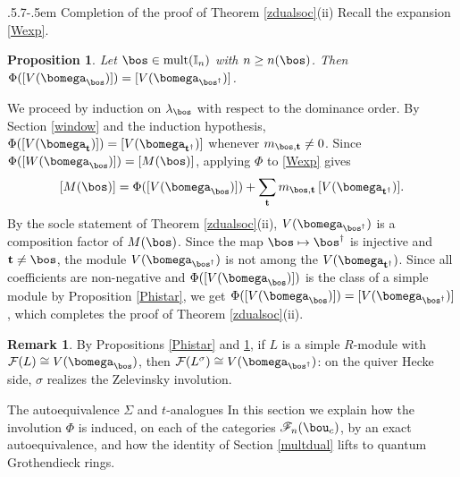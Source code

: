 \documentclass[11pt,reqno]{amsart}
\makeatletter
\newtheorem*{prop}{Proposition}
\theoremstyle{definition} \newtheorem*{defn}{Definition}
\theoremstyle{definition}
\newtheorem*{rem}{Remark}
\newenvironment{pf}{\proof}{\endproof}
\numberwithin{equation}{section}
\def\section{\def\@secnumfont{\mdseries}\@startsection{section}{1}%
  \z@{.7\linespacing\@plus\linespacing}{.5\linespacing}%
  {\normalfont\scshape\centering}}
\def\subsection{\def\@secnumfont{\bfseries}\@startsection{subsection}{2}%
  {\parindent}{.5\linespacing\@plus.7\linespacing}{-.5em}%
  {\normalfont\bfseries}}
\makeatother
\begin{document}
\subsection{Completion of the proof of Theorem \ref{zdualsoc}(ii)}
Recall the expansion \eqref{Wexp}.
\begin{prop}\label{OmegaPhi}
Let $\bos\in{\rm mult}(\mathbb I_n)$ with $n\ge n(\bos)$. Then $\Phi([V(\bomega_\bos)])=[V(\bomega_{\bos^\dagger})]$.
\end{prop}
\begin{pf}
We proceed by induction on $\lambda_\bos$ with respect to the dominance order. By Section \ref{window} and the induction hypothesis, $\Phi([V(\bomega_{\mathbf t})])=[V(\bomega_{\mathbf t^\dagger})]$ whenever $m_{\bos,\mathbf t}\neq0$. Since $\Phi([W(\bomega_\bos)])=[M(\bos)]$, applying $\Phi$ to \eqref{Wexp} gives
$$[M(\bos)]=\Phi([V(\bomega_\bos)])+\sum_{\mathbf t}m_{\bos,\mathbf t}\,[V(\bomega_{\mathbf t^\dagger})].$$
By the socle statement of Theorem \ref{zdualsoc}(ii), $V(\bomega_{\bos^\dagger})$ is a composition factor of $M(\bos)$. Since the map $\bos\mapsto\bos^\dagger$ is injective and $\mathbf t\neq\bos$, the module $V(\bomega_{\bos^\dagger})$ is not among the $V(\bomega_{\mathbf t^\dagger})$. Since all coefficients are non-negative and $\Phi([V(\bomega_\bos)])$ is the class of a simple module by Proposition \ref{Phistar}, we get $\Phi([V(\bomega_\bos)])=[V(\bomega_{\bos^\dagger})]$, which completes the proof of Theorem \ref{zdualsoc}(ii).
\end{pf}
\begin{rem}
By Propositions \ref{Phistar} and \ref{OmegaPhi}, if $L$ is a simple $R$-module with $\mathcal F(L)\cong V(\bomega_\bos)$, then $\mathcal F(L^\sigma)\cong V(\bomega_{\bos^\dagger})$: on the quiver Hecke side, $\sigma$ realizes the Zelevinsky involution.
\end{rem}

\section{The autoequivalence $\Sigma$ and $t$-analogues}\label{sec:sigma}
In this section we explain how the involution $\Phi$ is induced, on each of the categories
$\mathscr F_n(\bou_c)$, by an exact autoequivalence, and how the identity of Section \ref{multdual} lifts to
quantum Grothendieck rings.
\end{document}
